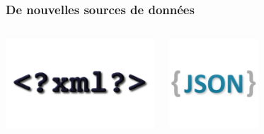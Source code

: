 \documentclass{beamer}
\begin{document}
\begin{frame}
  \frametitle{De nouvelles sources de données}

  
  \begin{columns}[c]
    \begin{center}
      \includegraphics[height=9em]{xml.png}
    \end{center}
    \begin{center}
      \includegraphics[height=9em]{logo-json.png}
    \end{center}
  \end{columns}
\end{frame}
\end{document}
